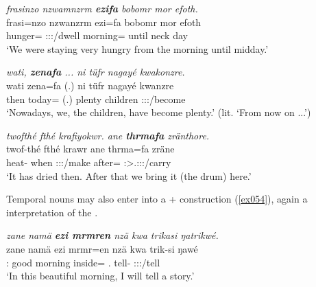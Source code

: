 \begin{exe}
	\ex \emph{frasinzo nzwamnzrm \textbf{ezifa} bobomr mor efoth.}\\
	\gll frasi=nzo nzwanzrm ezi=fa bobomr mor efoth\\
	hunger={\Only} \Fpl:\Sbj:\Pst:\Dur/dwell morning={\Abl} until neck day\\
	\trans `We were staying very hungry from the morning until midday.'\\ 
	\label{ex053}
\end{exe}
\begin{exe}
	\ex \emph{wati, \textbf{zenafa} ... ni tüfr nagayé kwakonzre.}\\
	\gll wati zena=fa (.) ni tüfr nagayé kwanzre\\
	then today={\Abl} (.) {\Fnsg} plenty children \Fpl:\Sbj:\Rpst:\Ipfv/become\\
	\trans `Nowadays, we, the children, have become plenty.' (lit. `From now on ...')\\ 
	\label{ex056}
\end{exe}
\begin{exe}
	\ex \emph{twofthé fthé krafiyokwr. ane \textbf{thrmafa} zränthore.}\\
	\gll twof-thé fthé krawr ane thrma=fa zräne\\
	heat-{\Adlzr} when \Stsg:\Sbj:\Irr:\Ipfv/make {\Dem} after={\Abl} \Fpl:\Sbj>\Tsg.\F:\Irr:\Pfv:\Venit/carry\\
	\trans `It has dried then. After that we bring it (the drum) here.'
	\label{ex059}
\end{exe}

Temporal nouns may also enter into a + construction (\ref{ex054}), again a  interpretation of the .

\begin{exe}
	\ex \emph{zane namä \textbf{ezi mrmren} nzä kwa trikasi ŋatrikwé.}\\
	\gll zane namä ezi mrmr=en nzä kwa trik-si ŋawé\\
	{\Dem}:{\Prox} good morning inside={\Loc} \Fsg.{\Abs} {\Fut} tell-{\Nmlz} \Fsg{}:\Sbj:\Nonpast:\Ipfv/tell\\
	\trans `In this beautiful morning, I will tell a story.' 
	\label{ex054}
\end{exe}

